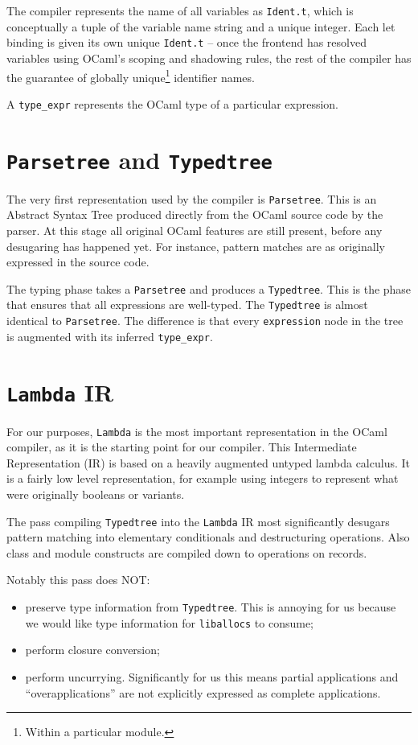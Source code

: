 \documentclass[12pt,a4paper,twoside,openright]{report}
\begin{document}
The compiler represents the name of all variables as \lstinline!Ident.t!, which
is conceptually a tuple of the variable name string and a unique integer. Each
let binding is given its own unique \lstinline!Ident.t! -- once the frontend
has resolved variables using OCaml's scoping and shadowing rules, the rest of
the compiler has the guarantee of globally unique\footnote{Within a particular
module.} identifier names.

A \lstinline!type_expr! represents the OCaml type of a particular expression.

\section{\texttt{Parsetree} and \texttt{Typedtree}}

The very first representation used by the compiler is \lstinline!Parsetree!.
This is an Abstract Syntax Tree produced directly from the OCaml source code by
the parser. At this stage all original OCaml features are still present, before
any desugaring has happened yet. For instance, pattern matches are as
originally expressed in the source code.

The typing phase takes a \lstinline!Parsetree! and produces a
\lstinline!Typedtree!. This is the phase that ensures that all expressions are
well-typed. The \lstinline!Typedtree! is almost identical to
\lstinline!Parsetree!. The difference is that every \lstinline!expression! node
in the tree is augmented with its inferred \lstinline!type_expr!.

\section{\texttt{Lambda} IR}

For our purposes, \lstinline!Lambda! is the most important representation in
the OCaml compiler, as it is the starting point for our compiler. This
Intermediate Representation (IR) is based on a heavily augmented untyped lambda calculus.
It is a fairly low level representation, for example using integers to represent
what were originally booleans or variants.

The pass compiling \lstinline!Typedtree! into the \lstinline!Lambda! IR most
significantly desugars pattern matching into elementary conditionals and
destructuring operations. Also class and module constructs are compiled down to
operations on records.

Notably this pass does NOT:
\begin{itemize}
    \item preserve type information from \lstinline!Typedtree!. This is annoying
        for us because we would like type information for
        \lstinline!liballocs! to consume;
    \item perform closure conversion;
    \item perform uncurrying. Significantly for us this means
        partial applications and ``overapplications'' are not explicitly
    expressed as complete applications.
\end{itemize}
\end{document}
